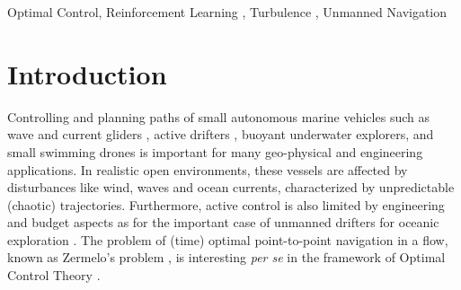 \documentclass[
]{ceurart}
\begin{document}
\begin{keywords}
  Optimal Control\sep
  Reinforcement Learning \sep
  Turbulence \sep
  Unmanned Navigation
\end{keywords}

\maketitle

\section{Introduction}
Controlling and planning paths of small autonomous marine vehicles
\cite{petres2007path} such as wave and current gliders
\cite{kraus2012wave}, active drifters
\cite{lumpkin2007measuring}, buoyant underwater explorers, and small swimming drones is important for many
geo-physical \cite{lermusiaux2017future} and engineering
\cite{bechinger2016active} applications. In realistic open environments, these vessels are
affected by disturbances like wind, waves and ocean
currents, characterized by unpredictable
(chaotic) trajectories. Furthermore, active control is also limited by engineering and budget aspects as for the important case of unmanned drifters for oceanic exploration 
\cite{centurioni2018drifter,roemmich2009argo}. The problem of (time) optimal point-to-point navigation in a flow, known as Zermelo's problem \cite{zermelo1931}, is interesting {\it per se} in the framework of Optimal Control Theory \cite{bryson2018}.
\end{document}
